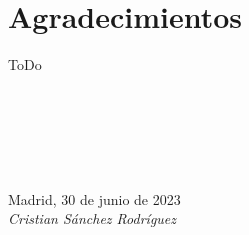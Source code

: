 \cleardoublepage

\chapter*{Agradecimientos}

ToDo
\

\

\

\

\begin{flushright}
		\par
		\vspace{1.0 cm}
		Madrid, 30 de junio de 2023\\ %
		\emph{Cristian Sánchez Rodríguez}
\end{flushright}

\thispagestyle{empty}


